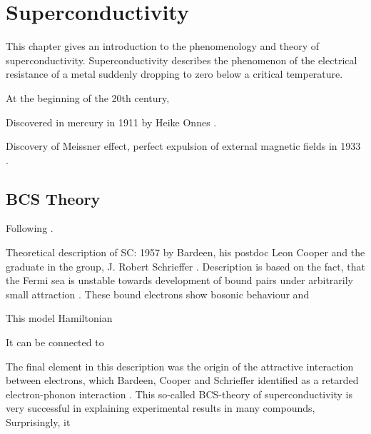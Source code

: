 \documentclass[../main.tex]{subfiles}
\begin{document}
\chapter{Superconductivity}

This chapter gives an introduction to the phenomenology and theory of superconductivity.
Superconductivity describes the phenomenon of the electrical resistance of a metal suddenly dropping to zero below a critical temperature.

At the beginning of the 20th century, 


Discovered in mercury in 1911 by Heike Onnes \cite{onnes1911further}.

Discovery of Meissner effect, perfect expulsion of external magnetic fields in 1933 \cite{meissnerNeuerEffektBei1933}.




\section{BCS Theory}

Following \cite[ch. 14]{colemanIntroductionManyBodyPhysics2015}.

Theoretical description of SC: 1957 by Bardeen, his postdoc Leon Cooper and the graduate in the group, J. Robert Schrieffer \cite{bardeenTheorySuperconductivity1957}.
Description is based on the fact, that the Fermi sea is unstable towards development of bound pairs under arbitrarily small attraction \cite{cooperBoundElectronPairs1956}.
These bound electrons show bosonic behaviour and 

This model Hamiltonian

It can be connected to 

The final element in this description was the origin of the attractive interaction between electrons, which Bardeen, Cooper and Schrieffer identified as a retarded electron-phonon interaction \cite{bardeenTheorySuperconductivity1957}.
This so-called BCS-theory of superconductivity is very successful in explaining experimental results in many compounds, 
Surprisingly, it
\end{document}
